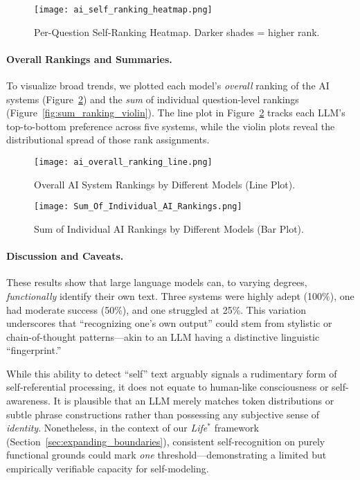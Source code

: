 \documentclass[12pt]{article}
\begin{document}
\begin{figure}[h]
    \centering
    \texttt{[image: ai\_self\_ranking\_heatmap.png]}
    \caption{Per-Question Self-Ranking Heatmap. Darker shades = higher rank.}
    \label{fig:self_ranking}
\end{figure}

\paragraph{Overall Rankings and Summaries.}
To visualize broad trends, we plotted each model’s \emph{overall} ranking of 
the AI systems (Figure~\ref{fig:overall_ranking_line}) and the \emph{sum} 
of individual question-level rankings (Figure~\ref{fig:sum_ranking_violin}). The line plot in Figure~\ref{fig:overall_ranking_line} 
tracks each LLM’s top-to-bottom preference across five systems, while the violin 
plots reveal the distributional spread of those rank assignments. 

\begin{figure}[h]
    \centering
    \texttt{[image: ai\_overall\_ranking\_line.png]}
    \caption{Overall AI System Rankings by Different Models (Line Plot).}
    \label{fig:overall_ranking_line}
\end{figure}

\begin{figure}[h]
    \centering
    \texttt{[image: Sum\_Of\_Individual\_AI\_Rankings.png]}
    \caption{Sum of Individual AI Rankings by Different Models (Bar Plot).}
    \label{fig:overall_ranking_violin}
\end{figure}



\paragraph{Discussion and Caveats.}
These results show that large language models can, to varying degrees, 
\emph{functionally} identify their own text. Three systems were highly adept 
(100\%), one had moderate success (50\%), and one struggled at 25\%. This 
variation underscores that “recognizing one’s own output” could stem from 
stylistic or chain-of-thought patterns—akin to an LLM having a distinctive 
linguistic “fingerprint.” 

While this ability to detect “self” text arguably signals a rudimentary form 
of self-referential processing, it does not equate to human-like consciousness 
or self-awareness. It is plausible that an LLM merely matches token distributions 
or subtle phrase constructions rather than possessing any subjective sense of 
\emph{identity}. Nonetheless, in the context of our \emph{Life}$^{*}$ framework 
(Section~\ref{sec:expanding_boundaries}), consistent self-recognition on purely 
functional grounds could mark \emph{one} threshold—demonstrating a limited but 
empirically verifiable capacity for self-modeling. 
\end{document}
